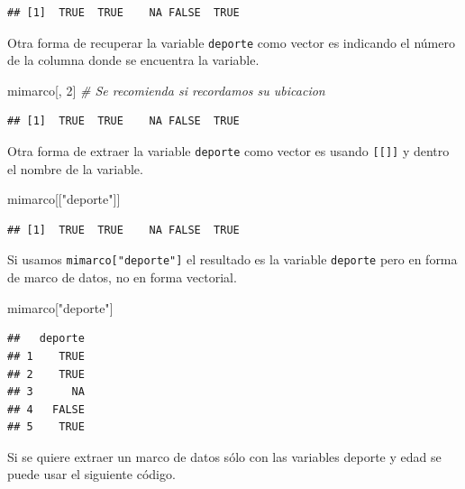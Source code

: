 \documentclass[
]{book}
\newenvironment{Shaded}{\begin{snugshade}}{\end{snugshade}}
\newcommand{\CommentTok}[1]{\textcolor[rgb]{0.56,0.35,0.01}{\textit{#1}}}
\newcommand{\DecValTok}[1]{\textcolor[rgb]{0.00,0.00,0.81}{#1}}
\newcommand{\NormalTok}[1]{#1}
\newcommand{\StringTok}[1]{\textcolor[rgb]{0.31,0.60,0.02}{#1}}
\begin{document}
\begin{verbatim}
## [1]  TRUE  TRUE    NA FALSE  TRUE
\end{verbatim}

Otra forma de recuperar la variable \texttt{deporte} como vector es indicando el número de la columna donde se encuentra la variable.

\begin{Shaded}
\begin{Highlighting}[]
\NormalTok{mimarco[, }\DecValTok{2}\NormalTok{]  }\CommentTok{\# Se recomienda si recordamos su ubicacion}
\end{Highlighting}
\end{Shaded}

\begin{verbatim}
## [1]  TRUE  TRUE    NA FALSE  TRUE
\end{verbatim}

Otra forma de extraer la variable \texttt{deporte} como vector es usando \texttt{{[}{[}{]}{]}} y dentro el nombre de la variable.

\begin{Shaded}
\begin{Highlighting}[]
\NormalTok{mimarco[[}\StringTok{"deporte"}\NormalTok{]]}
\end{Highlighting}
\end{Shaded}

\begin{verbatim}
## [1]  TRUE  TRUE    NA FALSE  TRUE
\end{verbatim}

Si usamos \texttt{mimarco{[}"deporte"{]}} el resultado es la variable \texttt{deporte} pero en forma de marco de datos, no en forma vectorial.

\begin{Shaded}
\begin{Highlighting}[]
\NormalTok{mimarco[}\StringTok{"deporte"}\NormalTok{]}
\end{Highlighting}
\end{Shaded}

\begin{verbatim}
##   deporte
## 1    TRUE
## 2    TRUE
## 3      NA
## 4   FALSE
## 5    TRUE
\end{verbatim}

Si se quiere extraer un marco de datos sólo con las variables deporte y edad se puede usar el siguiente código.
\end{document}
